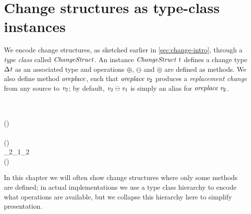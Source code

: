 \section{Change structures as type-class instances}
\label{sec:diff-examples-tc}
We encode change structures, as sketched earlier in \cref{sec:change-intro},
through a \emph{type class} called \ensuremath{\Conid{ChangeStruct}}. An instance \ensuremath{\Conid{ChangeStruct}\;\Varid{t}}
defines a change type \ensuremath{\Delta \Varid{t}} as an associated type and operations \ensuremath{\oplus },
\ensuremath{\ominus } and \ensuremath{\circledcirc } are defined as methods. We also define method
\ensuremath{\Varid{oreplace}}, such that \ensuremath{\Varid{oreplace}\;\Varid{v}_{2}} produces a \emph{replacement change} from
any source to \ensuremath{\Varid{v}_{2}}; by default, \ensuremath{\Varid{v}_{2}\ominus \Varid{v}_{1}} is simply an alias for
\ensuremath{\Varid{oreplace}\;\Varid{v}_{2}}.
\begin{hscode}\SaveRestoreHook
{}%
%
%
\>[B]{}\;\;\;\<[E]%
\\
\>[B]{}\<[3]%
\>[3]{}\;\Delta {}\<[E]%
\\
\>[B]{}\<[3]%
\>[3]{}(\oplus)\mathrel{:\mkern-1mu:}\to \Delta {}\to {}\<[E]%
\\
\>[B]{}\<[3]%
\>[3]{}\mathrel{:\mkern-1mu:}\to \Delta {}\<[E]%
\\
\>[B]{}\<[3]%
\>[3]{}(\ominus)\mathrel{:\mkern-1mu:}\to {}\to \Delta {}\<[E]%
\\
\>[B]{}\<[3]%
\>[3]{}_{2}\ominus {}_{1}\mathrel{=}\;_{2}{}\<[E]%
\\
\>[B]{}\<[3]%
\>[3]{}(\circledcirc )\mathrel{:\mkern-1mu:}\Delta {}\to \Delta {}\to \Delta {}\<[E]%
\\
\>[B]{}\<[3]%
\>[3]{}\NilC{}\mathrel{:\mkern-1mu:}\to \Delta {}\<[E]%
\ColumnHook
\end{hscode}\resethooks
In this chapter we will
often show change structures where only some methods are defined; in actual
implementations we use a type class hierarchy to encode what operations are
available, but we collapse this hierarchy here to simplify presentation.

